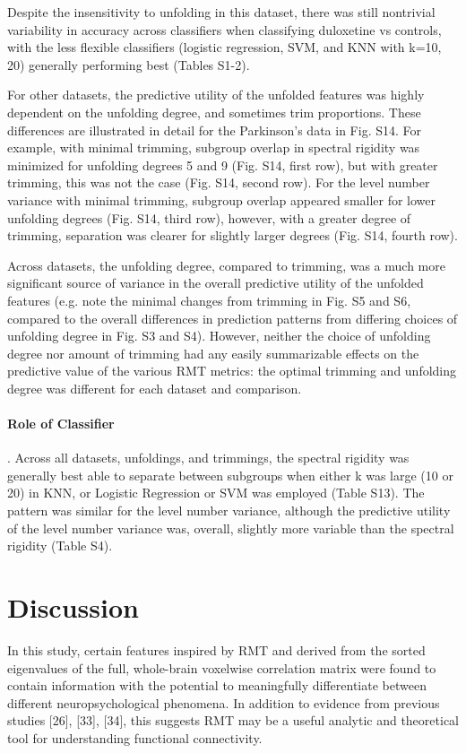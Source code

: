 Despite the insensitivity to unfolding in this dataset, there was still nontrivial variability in
accuracy across classifiers when classifying duloxetine vs controls, with the less flexible
classifiers (logistic regression, SVM, and KNN with k=10, 20) generally performing best (Tables
S1-2).

For other datasets, the predictive utility of the unfolded features was highly dependent on the
unfolding degree, and sometimes trim proportions. These differences are illustrated in detail for
the Parkinson's data in Fig. S14. For example, with minimal trimming, subgroup overlap in spectral
rigidity was minimized for unfolding degrees 5 and 9 (Fig. S14, first row), but with greater
trimming, this was not the case (Fig. S14, second row). For the level number variance with minimal
trimming, subgroup overlap appeared smaller for lower unfolding degrees (Fig. S14, third row),
however, with a greater degree of trimming, separation was clearer for slightly larger degrees (Fig.
S14, fourth row).

Across datasets, the unfolding degree, compared to trimming, was a much more significant source of
variance in the overall predictive utility of the unfolded features (e.g. note the minimal changes
from trimming in Fig. S5 and S6, compared to the overall differences in prediction patterns from
differing choices of unfolding degree in Fig. S3 and S4). However, neither the choice of unfolding
degree nor amount of trimming had any easily summarizable effects on the predictive value of the
various RMT metrics: the optimal trimming and unfolding degree was different for each dataset and
comparison.

\paragraph{Role of Classifier}. Across all datasets, unfoldings, and trimmings, the spectral rigidity was
generally best able to separate between subgroups when either k was large (10 or 20) in KNN, or
Logistic Regression or SVM was employed (Table S13). The pattern was similar for the level number
variance, although the predictive utility of the level number variance was, overall, slightly more
variable than the spectral rigidity (Table S4).

\section{Discussion}
In this study, certain features inspired by RMT and derived from the sorted eigenvalues of the full,
whole-brain voxelwise correlation matrix were found to contain information with the potential to
meaningfully differentiate between different neuropsychological phenomena. In addition to evidence
from previous studies [26], [33], [34], this suggests RMT may be a useful analytic and theoretical
tool for understanding functional connectivity.

